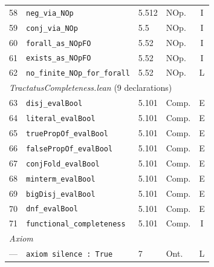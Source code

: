 \documentclass[10pt, letterpaper]{article}
\theoremstyle{definition}
\theoremstyle{remark}
\begin{document}
\begin{table}[p]
\begin{tabular}{@{}rlllc@{}}
58 & \texttt{neg\_via\_NOp}                             & 5.512   & NOp. & I \\
59 & \texttt{conj\_via\_NOp}                            & 5.5     & NOp. & I \\
60 & \texttt{forall\_as\_NOpFO}                         & 5.52    & NOp. & I \\
61 & \texttt{exists\_as\_NOpFO}                         & 5.52    & NOp. & I \\
62 & \texttt{no\_finite\_NOp\_for\_forall}              & 5.52    & NOp. & L \\
\midrule
\multicolumn{5}{l}{\emph{TractatusCompleteness.lean} (9 declarations)} \\
\midrule
63 & \texttt{disj\_evalBool}                            & 5.101   & Comp. & E \\
64 & \texttt{literal\_evalBool}                         & 5.101   & Comp. & E \\
65 & \texttt{truePropOf\_evalBool}                      & 5.101   & Comp. & E \\
66 & \texttt{falsePropOf\_evalBool}                     & 5.101   & Comp. & E \\
67 & \texttt{conjFold\_evalBool}                        & 5.101   & Comp. & E \\
68 & \texttt{minterm\_evalBool}                         & 5.101   & Comp. & E \\
69 & \texttt{bigDisj\_evalBool}                         & 5.101   & Comp. & E \\
70 & \texttt{dnf\_evalBool}                             & 5.101   & Comp. & E \\
71 & \texttt{functional\_completeness}                  & 5.101   & Comp. & I \\
\midrule
\multicolumn{5}{l}{\emph{Axiom}} \\
\midrule
--- & \texttt{axiom silence : True}                      & 7       & Ont. & L \\
\bottomrule
\end{tabular}
\end{table}

\end{document}
